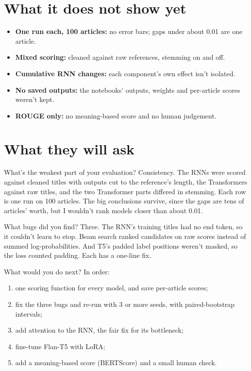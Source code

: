 \section{What it does not show yet}
\begin{itemize}
  \item \textbf{One run each, 100 articles:} no error bars; gaps under about 0.01 are one article.
  \item \textbf{Mixed scoring:} cleaned against raw references, stemming on and off.
  \item \textbf{Cumulative RNN changes:} each component's own effect isn't isolated.
  \item \textbf{No saved outputs:} the notebooks' outputs, weights and per-article scores weren't kept.
  \item \textbf{ROUGE only:} no meaning-based score and no human judgement.
\end{itemize}

\section{What they will ask}

\begin{iq}[\core]{What's the weakest part of your evaluation?}
Consistency. The RNNs were scored against cleaned titles with outputs cut to the reference's length, the Transformers against raw titles, and the two Transformer parts differed in stemming. Each row is one run on 100 articles. The big conclusions survive, since the gaps are tens of articles' worth, but I wouldn't rank models closer than about 0.01.
\end{iq}

\begin{iq}[\core]{What bugs did you find?}
Three. The RNN's training titles had no end token, so it couldn't learn to stop. Beam search ranked candidates on raw scores instead of summed log-probabilities. And T5's padded label positions weren't masked, so the loss counted padding. Each has a one-line fix.
\end{iq}

\begin{iq}[\core]{What would you do next?}
In order:
\begin{enumerate}
  \item one scoring function for every model, and save per-article scores;
  \item fix the three bugs and re-run with 3 or more seeds, with paired-bootstrap intervals;
  \item add attention to the RNN, the fair fix for its bottleneck;
  \item fine-tune Flan-T5 with LoRA;
  \item add a meaning-based score (BERTScore) and a small human check.
\end{enumerate}
\end{iq}

